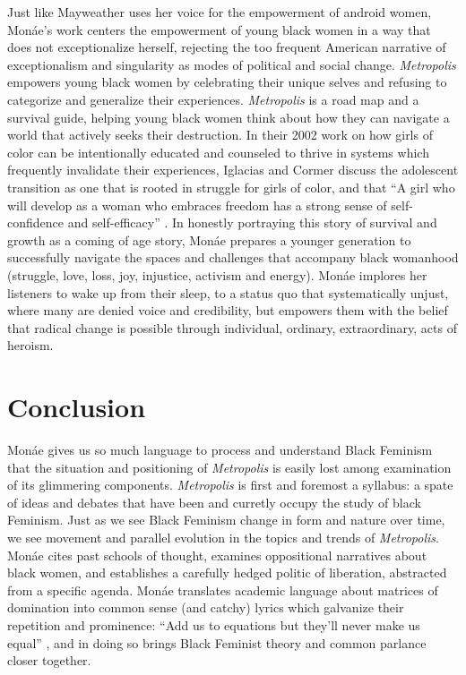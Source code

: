 \documentclass[a4paper, 11pt]{article} %
\begin{document}
Just like Mayweather uses her voice for the empowerment of android women, Mon\'ae's work centers the empowerment of young black women in a way that does not exceptionalize herself, rejecting the too frequent American narrative of exceptionalism and singularity as modes of political and social change. 
\emph{Metropolis} empowers young black women by celebrating their unique selves and refusing to categorize and generalize their experiences. 
\emph{Metropolis} is a road map and a survival guide, helping young black women think about how they can navigate a world that actively seeks their destruction.
In their 2002 work on how girls of color can be intentionally educated and counseled to thrive in systems which frequently invalidate their experiences, Iglacias and Cormer discuss the adolescent transition as one that is rooted in struggle for girls of color, and that ``A girl who will develop as a woman who embraces freedom has a strong sense of self-confidence and self-efficacy'' .
In honestly portraying this story of survival and growth as a coming of age story, Mon\'ae prepares a younger generation to successfully navigate the spaces and challenges that accompany black womanhood (struggle, love, loss, joy, injustice, activism and energy).
Mon\'ae implores her listeners to wake up from their sleep, to a status quo that systematically unjust, where many are denied voice and credibility, but empowers them with the belief that radical change is possible through individual, ordinary, extraordinary, acts of heroism.


\section*{Conclusion}

Mon\'ae gives us so much language to process and understand Black Feminism that the situation and positioning of \emph{Metropolis} is easily lost among examination of its glimmering components.
\emph{Metropolis} is first and foremost a syllabus: a spate of ideas and debates that have been and curretly occupy the study of black Feminism.
Just as we see Black Feminism change in form and nature over time, we see movement and parallel evolution in the topics and trends of \emph{Metropolis}.
Mon\'ae cites past schools of thought, examines oppositional narratives about black women, and establishes a carefully hedged politic of liberation, abstracted from a specific agenda. 
Mon\'ae translates academic language about matrices of domination into common sense (and catchy) lyrics which galvanize their repetition and prominence: ``Add us to equations but they'll never make us equal'' , and in doing so brings Black Feminist theory and common parlance closer together.
\end{document}
